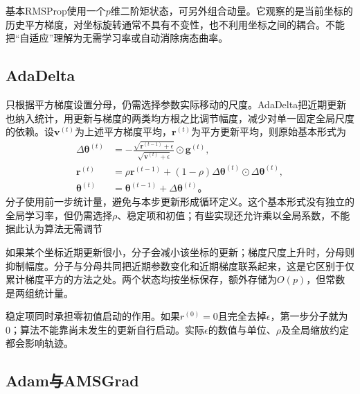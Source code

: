 基本RMSProp使用一个$p$维二阶矩状态，可另外组合动量。它观察的是当前坐标的历史平方梯度，对坐标旋转通常不具有不变性，也不利用坐标之间的耦合。不能把“自适应”理解为无需学习率或自动消除病态曲率。

\subsection{AdaDelta}
\label{sec:training-adadelta}

只根据平方梯度设置分母，仍需选择参数实际移动的尺度。AdaDelta把近期更新也纳入统计，用更新与梯度的两类均方根之比调节幅度，减少对单一固定全局尺度的依赖。设$\bm v^{(t)}$为上述平方梯度平均，$\bm r^{(t)}$为平方更新平均，则原始基本形式为
\begin{align}
  \Delta\bm\theta^{(t)}&=-\frac{\sqrt{\bm r^{(t-1)}+\epsilon}}
                               {\sqrt{\bm v^{(t)}+\epsilon}}
                                \odot\bm g^{(t)},\\
  \bm r^{(t)}&=\rho\bm r^{(t-1)}+(1-\rho)
      \Delta\bm\theta^{(t)}\odot\Delta\bm\theta^{(t)},\\
  \bm\theta^{(t)}&=\bm\theta^{(t-1)}+\Delta\bm\theta^{(t)}\text{。}
  \label{eq:training-adadelta}
\end{align}
分子使用前一步统计量，避免与本步更新形成循环定义。这个基本形式没有独立的全局学习率，但仍需选择$\rho$、稳定项和初值；有些实现还允许乘以全局系数，不能据此认为算法无需调节

如果某个坐标近期更新很小，分子会减小该坐标的更新；梯度尺度上升时，分母则抑制幅度。分子与分母共同把近期参数变化和近期梯度联系起来，这是它区别于仅累计梯度平方的方法之处。两个状态均按坐标保存，额外存储为$O(p)$，但常数是两组统计量。

稳定项同时承担零初值启动的作用。如果$r^{(0)}=0$且完全去掉$\epsilon$，第一步分子就为0；算法不能靠尚未发生的更新自行启动。实际$\epsilon$的数值与单位、$\rho$及全局缩放约定都会影响轨迹。

\subsection{Adam与AMSGrad}
\label{sec:training-adam}

